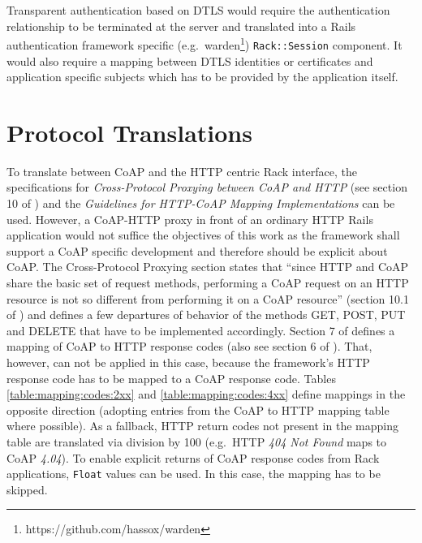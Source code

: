 		Transparent authentication based on \ac{DTLS} would require the
		authentication relationship to be terminated at the server and
		translated into a Rails authentication framework specific (e.g.\ 
		warden\footnote{https://github.com/hassox/warden})
		\texttt{Rack::Session} component. It would also require a mapping
		between \ac{DTLS} identities or certificates and application specific
		subjects which has to be provided by the application itself.

\section{Protocol Translations}
\label{cha:design:protocol}

	To translate between CoAP and the \ac{HTTP} centric Rack interface, the
	specifications for \emph{Cross-Protocol Proxying between \ac{CoAP} and
	\ac{HTTP}} (see section 10 of \cite{coap}) and the \emph{Guidelines for
	\ac{HTTP}-\ac{CoAP} Mapping Implementations} \cite{coap-mapping} can be
	used. However, a \ac{CoAP}-\ac{HTTP} proxy in front of an ordinary
	\ac{HTTP} \ac{Rails} application would not suffice the objectives of this
	work as the framework shall support a \ac{CoAP} specific development and
	therefore should be explicit about \ac{CoAP}. The Cross-Protocol Proxying
	section states that \enquote{since \ac{HTTP} and \ac{CoAP} share the basic
	set of request methods, performing a \ac{CoAP} request on an \ac{HTTP}
	resource is not so different from performing it on a \ac{CoAP} resource}
	(section 10.1 of \cite{coap}) and defines a few departures of behavior of
	the methods GET, POST, PUT and DELETE that have to be implemented
	accordingly. Section 7 of \cite{coap-mapping} defines a mapping of
	\ac{CoAP} to \ac{HTTP} response codes (also see section 6 of
	\cite{http-1}). That, however, can not be applied in this case, because
	the framework's \ac{HTTP} response code has to be mapped to a \ac{CoAP}
	response code. Tables \ref{table:mapping:codes:2xx} and
	\ref{table:mapping:codes:4xx} define mappings in the opposite direction
	(adopting entries from the \ac{CoAP} to \ac{HTTP} mapping table where
	possible). As a fallback, \ac{HTTP} return codes not present in the mapping
	table are translated via division by 100 (e.g.\ \ac{HTTP} \emph{404 Not
	Found} maps to \ac{CoAP} \emph{4.04}). To enable explicit returns of
	\ac{CoAP} response codes from Rack applications, \texttt{Float} values can
	be used. In this case, the mapping has to be skipped.

